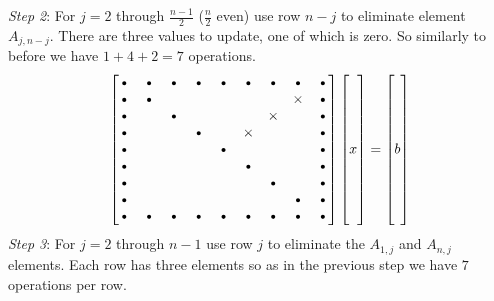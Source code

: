 \documentclass[12pt]{article}
\begin{document}
	\emph{Step 2}: For $j=2$ through $\tfrac{n-1}{2}$ ($\tfrac{n}{2}$ even) use row $n-j$ to eliminate element $A_{j,n-j}$. There are three values to update, one of which is zero. So similarly to before we have $1+4+2=7$ operations.
	$$
	\begin{bmatrix}
	\text{\textbullet}&\text{\textbullet}&\text{\textbullet}&\text{\textbullet}&\text{\textbullet}&\text{\textbullet}&\text{\textbullet}&\text{\textbullet}&\text{\textbullet}\\
	\text{\textbullet}&\text{\textbullet}&&&&&&\times&\text{\textbullet}\\
	\text{\textbullet}&&\text{\textbullet}&&&&\times&&\text{\textbullet}\\
	\text{\textbullet}&&&\text{\textbullet}&&\times&&&\text{\textbullet}\\
	\text{\textbullet}&&&&\text{\textbullet}&&&&\text{\textbullet}\\
	\text{\textbullet}&&&&&\text{\textbullet}&&&\text{\textbullet}\\
	\text{\textbullet}&&&&&&\text{\textbullet}&&\text{\textbullet}\\
	\text{\textbullet}&&&&&&&\text{\textbullet}&\text{\textbullet}\\
	\text{\textbullet}&\text{\textbullet}&\text{\textbullet}&\text{\textbullet}&\text{\textbullet}&\text{\textbullet}&\text{\textbullet}&\text{\textbullet}&\text{\textbullet}\\
	\end{bmatrix}\begin{bmatrix}\\ \\ \\ \\ x \\ \\ \\ \\ \\\end{bmatrix}= \begin{bmatrix}\\ \\ \\ \\ b \\ \\ \\ \\ \\\end{bmatrix}
	$$
	\emph{Step 3}: For $j=2$ through $n-1$ use row $j$ to eliminate the $A_{1,j}$ and $A_{n,j}$ elements. Each row has three elements so as in the previous step we have $7$ operations per row. 
\end{document}

